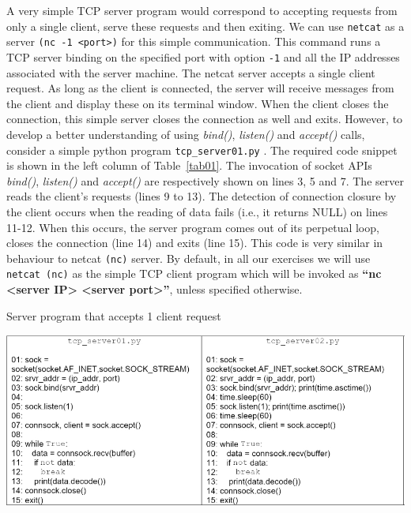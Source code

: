\begin{multicols}{2}
A very simple TCP server program would correspond to accepting requests from only a single client, serve these requests and then exiting. We can use \texttt{netcat} as a server \texttt{(nc -1 <port>)} for this simple communication. This command runs a TCP server binding on the specified port with option \texttt{-1} and all the IP addresses associated with the server machine. The netcat server accepts a single client request. As long as the client is connected, the server will receive messages from the client and display these on its terminal window. When the client closes the connection, this simple server closes the connection as well and exits. However, to develop a better understanding of using \textit{bind()}, \textit{listen()} and \textit{accept()} calls, consider a simple python program \texttt{tcp\_server01.py} \cite{art1-key17}. The required code snippet is shown in the left column of Table~\ref{tab01}. The invocation of socket APIs \textit{bind()}, \textit{listen()} and \textit{accept()} are respectively shown on lines 3, 5 and 7. The server reads the client’s requests (lines 9 to 13). The detection of connection closure by the client occurs when the reading of data fails (i.e., it returns NULL) on lines 11-12. When this occurs, the server program comes out of its perpetual loop, closes the connection (line 14) and exits (line 15). This code is very similar in behaviour to netcat \texttt{(nc)} server. By default, in all our exercises we will use \texttt{netcat (nc)} as the simple TCP client program which will be invoked as \textbf{“nc <server IP> <server port>”}, unless specified otherwise.
\end{multicols}

\setcounter{section}{0}
\begin{table}[H]

\vspace{-.8cm}

\centering
\caption{Server program that accepts 1 client request}\label{tab01}
\includegraphics[scale=2.25]{src/Figures/chap1/tab01.jpg}
\end{table}

